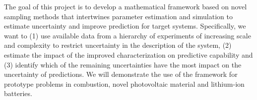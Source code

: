 \documentclass[11pt]{article}
\begin{document}
The goal of this project is to develop a mathematical framework  
based on novel sampling methods that
intertwines parameter estimation and simulation 
to estimate uncertainty and improve prediction for target systems.
Specifically, we want to
(1) use available data from a hierarchy
of experiments of increasing scale and complexity to restrict
uncertainty in the description of the system, (2) estimate the impact of the improved characterization
on predictive capability and (3) identify which of the remaining uncertainties have the most impact
on the uncertainty of predictions.
We will demonstrate the use of the framework for prototype problems in combustion,
novel photovoltaic material and lithium-ion batteries.




 
\end{document}
